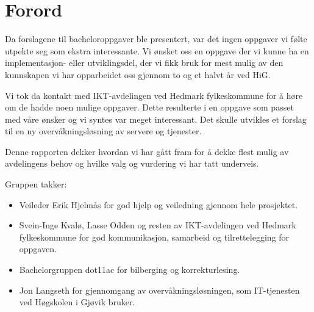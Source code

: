 \chapter*{Forord}
Da forslagene til bacheloroppgaver ble presentert, var det ingen oppgaver vi følte utpekte seg som ekstra interessante. Vi ønsket oss en oppgave der vi kunne ha en implementasjon- eller utviklingsdel, der vi fikk bruk for mest mulig av den kunnskapen vi har opparbeidet oss gjennom to og et halvt år ved HiG. 

Vi tok da kontakt med IKT-avdelingen ved Hedmark fylkeskommune for å høre om de hadde noen mulige oppgaver. Dette resulterte i en oppgave som passet med våre ønsker og vi syntes var meget interessant. Det skulle utvikles et forslag til en ny overvåkningsløsning av servere og tjenester. 

Denne rapporten dekker hvordan vi har gått fram for å dekke flest mulig av avdelingens behov og hvilke valg og vurdering vi har tatt underveis.
 
Gruppen takker:
\begin{itemize} 
\item Veileder Erik Hjelmås for god hjelp og veiledning gjennom hele prosjektet.
\item Svein-Inge Kvalø, Lasse Odden og resten av IKT-avdelingen ved Hedmark fylkeskommune for god kommunikasjon, samarbeid og tilrettelegging for oppgaven.
\item Bachelorgruppen dot11ac for bilberging og korrekturlesing.
\item Jon Langseth for gjennomgang av overvåkningsløsningen, som IT-tjenesten ved Høgskolen i Gjøvik bruker.
\end{itemize}

